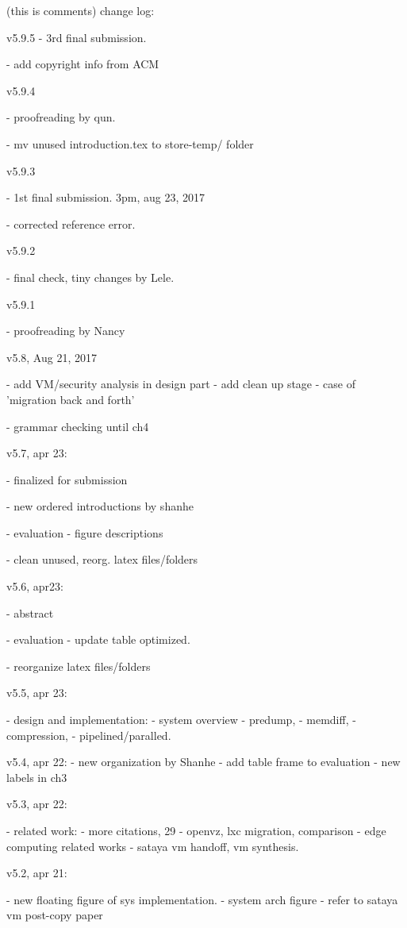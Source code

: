 
\iffalse
(this is comments) change log:


v5.9.5
 - 3rd final submission.
 
 - add copyright info from ACM
 
v5.9.4

 - proofreading by qun.
 
 - mv unused introduction.tex to store-temp/ folder
 
v5.9.3

 - 1st final submission. 3pm, aug 23, 2017
 
 - corrected reference error.
 
v5.9.2

 - final check, tiny changes by Lele.
 
v5.9.1

 - proofreading by Nancy

v5.8, Aug 21, 2017

 - add VM/security analysis in design part
 - add clean up stage
 - case of 'migration back and forth'
 
 - grammar checking until ch4
 
v5.7, apr 23:

 - finalized for submission

 - new ordered introductions by shanhe
 
 - evaluation
     - figure descriptions
     
 - clean unused, reorg. latex files/folders
 
    
v5.6, apr23:
    
 - abstract
 
 - evaluation
     - update table optimized.
     
 - reorganize latex files/folders

v5.5, apr 23:

    - design and implementation:
        - system overview
        - predump, 
        - memdiff, 
        - compression, 
        - pipelined/paralled.

v5.4, apr 22:
    - new organization by Shanhe
    - add table frame to evaluation
    - new labels in ch3
    
v5.3, apr 22:

 - related work:
    - more citations, 29
    - openvz, lxc migration, comparison
    - edge computing related works
    - sataya vm handoff, vm synthesis. 
    


v5.2, apr 21:

 - new floating figure of sys implementation.
    - system arch figure
    - refer to sataya vm post-copy paper
    

